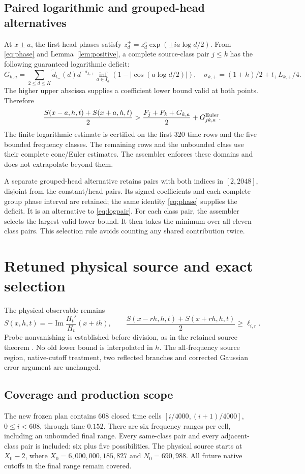 \documentclass[11pt,a4paper]{article}
\theoremstyle{definition}\newtheorem{definition}[theorem]{Definition}
\theoremstyle{remark}\newtheorem{remark}[theorem]{Remark}
\newcommand{\Ima}{\operatorname{Im}}
\begin{document}
\subsection{Paired logarithmic and grouped-head alternatives}
At $x\pm a$, the first-head phases satisfy
$z_d^\pm=z_d^c\exp(\pm ia\log d/2)$. From \eqref{eq:phase} and
Lemma~\ref{lem:positive}, a complete source-class pair $j\le k$ has the
following guaranteed logarithmic deficit:
\[
G_{k,a}=\sum_{2\le d\le K}\widetilde d_{t_-}(d)d^{-\sigma_{k,+}}
\inf_{a\in I_a}\left(1-|\cos(a\log d/2)|\right),
\quad
\sigma_{k,+}=(1+h)/2+t_+L_{k,+}/4.
\]
The higher upper abscissa supplies a coefficient lower bound valid at
both points. Therefore
\begin{equation}\label{eq:logpair}
\frac{S(x-a,h,t)+S(x+a,h,t)}2
>\frac{F_j+F_k+G_{k,a}}2+G^{\rm Euler}_{jk,a}.
\end{equation}
The finite logarithmic estimate is certified on the first 320 time rows
and the five bounded frequency classes. The remaining rows and the unbounded
class use their complete cone/Euler estimates. The assembler enforces these
domains and does not extrapolate beyond them.

A separate grouped-head alternative retains pairs with both indices in
$[2,2048]$, disjoint from the constant/head pairs. Its signed coefficients
and each complete group phase interval are retained; the same identity
\eqref{eq:phase} supplies the deficit. It is an alternative to
\eqref{eq:logpair}. For each class pair, the assembler selects the largest valid lower bound.
It then takes the minimum over all eleven class pairs. This selection rule
avoids counting any shared contribution twice.

\section{Retuned physical source and exact selection}\label{sec:retuned}
The physical observable remains
\[
 S(x,h,t)=-\Ima\frac{H_t'}{H_t}(x+ih),\qquad
 \frac{S(x-rh,h,t)+S(x+rh,h,t)}2\ge\ell_{i,r}.
\]
Probe nonvanishing is established before division, as in the retained
source theorem \cite{source}. No old lower bound is interpolated in $h$.
The all-frequency source region, native-cutoff treatment, two reflected
branches and corrected Gaussian error argument are unchanged.

\subsection{Coverage and production scope}
The new frozen plan contains 608 closed time cells
$[i/4000,(i+1)/4000]$, $0\le i<608$, through time $0.152$.
There are six frequency ranges per cell, including an unbounded final
range. Every same-class pair and every adjacent-class pair is included:
six plus five possibilities. The physical source starts at
$X_0-2$, where $X_0=6{,}000{,}000{,}185{,}827$ and $N_0=690{,}988$.
All future native cutoffs in the final range remain covered.
\end{document}
